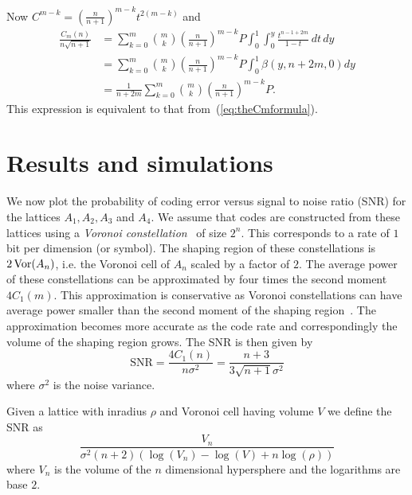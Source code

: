 \documentclass[draftcls, onecolumn, 11pt]{IEEEtran}
\begin{document}
Now $C^{m-k} = \left(\frac{n}{n+1} \right)^{m-k} t^{2(m-k)}$ and
\begin{align*}
\frac{C_m(n)}{n\sqrt{n+1}} &= \sum_{k=0}^{m} \binom{m}{k} \left(\frac{n}{n+1} \right)^{m-k} P \int_0^1 \int_0^y \frac{t^{n - 1 + 2m}}{1 - t} \, dt \, dy \\
&= \sum_{k=0}^{m} \binom{m}{k} \left(\frac{n}{n+1} \right)^{m-k} P \int_0^1 \beta(y,n+2m,0) dy \\
&= \frac{1}{n+2m} \sum_{k=0}^{m} \binom{m}{k} \left(\frac{n}{n+1} \right)^{m-k} P.
\end{align*}
This expression is equivalent to that from~(\ref{eq:theCmformula}).


\section{Results and simulations}\label{sec:results-simulations}

We now plot the probability of coding error versus signal to noise ratio (SNR) for the lattices $A_1, A_2, A_3$ and $A_4$.  We assume that codes are constructed from these lattices using a \emph{Voronoi constellation}~\cite{Conway1983VoronoiCodes} of size $2^n$.  This corresponds to a rate of $1$ bit per dimension (or symbol).  The shaping region of these constellations is $2\operatorname{Vor}(A_n)$, i.e. the Voronoi cell of $A_n$ scaled by a factor of $2$.  The average power of these constellations can be approximated by four times the second moment $4C_1(m)$.  This approximation is conservative as Voronoi constellations can have average power smaller than the second moment of the shaping region~\cite{Conway1983VoronoiCodes}.  The approximation becomes more accurate as the code rate and correspondingly the volume of the shaping region grows.  %
The SNR is then given by
\[
\text{SNR} = \frac{4C_1(n)}{n \sigma^2} = \frac{n+3}{3\sqrt{n+1}\sigma^2}
\]
where $\sigma^2$ is the noise variance.  %

Given a lattice with inradius $\rho$ and Voronoi cell having volume $V$ we define the SNR as
\[
\frac{V_n}{\sigma^2(n+2)(\log(V_n) - \log(V) + n\log(\rho))}
\]
where $V_n$ is the volume of the $n$ dimensional hypersphere and the logarithms are base $2$.
\end{document}
